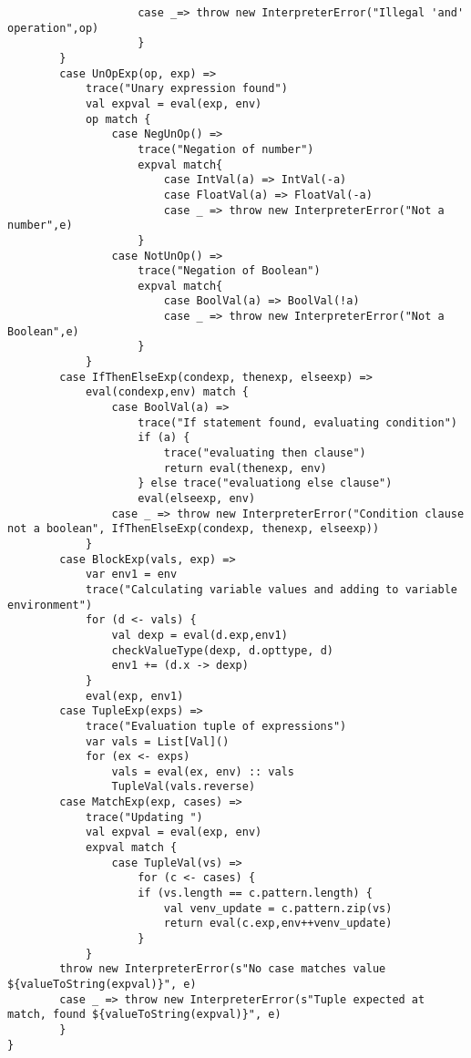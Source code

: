 \documentclass[a4paper, 10pt]{article}
\begin{document}
\begin{lstlisting}
					case _=> throw new InterpreterError("Illegal 'and' operation",op)
					}
		}
		case UnOpExp(op, exp) =>
			trace("Unary expression found")
			val expval = eval(exp, env)
			op match {
				case NegUnOp() =>
					trace("Negation of number")
					expval match{
						case IntVal(a) => IntVal(-a)
						case FloatVal(a) => FloatVal(-a)
						case _ => throw new InterpreterError("Not a number",e)
					}
				case NotUnOp() =>
					trace("Negation of Boolean")
					expval match{
						case BoolVal(a) => BoolVal(!a)
						case _ => throw new InterpreterError("Not a Boolean",e)
					}
			}
		case IfThenElseExp(condexp, thenexp, elseexp) =>
			eval(condexp,env) match {
				case BoolVal(a) =>
					trace("If statement found, evaluating condition")
					if (a) {
						trace("evaluating then clause")
						return eval(thenexp, env)
					} else trace("evaluationg else clause")
					eval(elseexp, env)
				case _ => throw new InterpreterError("Condition clause not a boolean", IfThenElseExp(condexp, thenexp, elseexp))
			}
		case BlockExp(vals, exp) =>
			var env1 = env
			trace("Calculating variable values and adding to variable environment")
			for (d <- vals) {
				val dexp = eval(d.exp,env1)
				checkValueType(dexp, d.opttype, d)
				env1 += (d.x -> dexp)
			}
			eval(exp, env1)
		case TupleExp(exps) =>
			trace("Evaluation tuple of expressions")
			var vals = List[Val]()
			for (ex <- exps)
				vals = eval(ex, env) :: vals
				TupleVal(vals.reverse)
		case MatchExp(exp, cases) =>
			trace("Updating ")
			val expval = eval(exp, env)
			expval match {
				case TupleVal(vs) =>
					for (c <- cases) {
					if (vs.length == c.pattern.length) {
						val venv_update = c.pattern.zip(vs)
						return eval(c.exp,env++venv_update)
					}
			}
		throw new InterpreterError(s"No case matches value ${valueToString(expval)}", e)
		case _ => throw new InterpreterError(s"Tuple expected at match, found ${valueToString(expval)}", e)
		}
}
\end{lstlisting}
\end{document}
